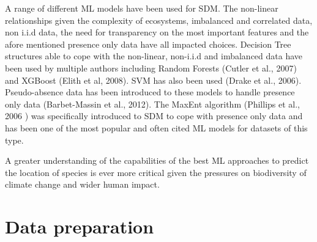 \documentclass{article}
\begin{document}
A range of different ML models have been used for SDM.  The non-linear relationships given the complexity of ecosystems,  imbalanced and correlated data, non i.i.d data, the need for transparency on the most important features and the afore mentioned presence only data have all impacted choices.   Decision Tree structures able to cope with the non-linear, non-i.i.d and imbalanced data have been used by multiple authors including Random Forests\cite{rf} (Cutler et al., 2007) and XGBoost\cite{xgboost} (Elith et al, 2008).  SVM has also been used \cite{svm}(Drake et al., 2006).   Pseudo-absence data has been introduced to these models to handle presence only data \cite{presence_only}(Barbet-Massin et al., 2012). The MaxEnt algorithm \cite{MaxEnt} (Phillips et al., 2006 ) was specifically introduced to SDM to cope with presence only data and has been one of the most popular and often cited ML models for datasets of this type.  

A greater understanding of the capabilities of the best ML approaches to predict the location of species is ever more critical given the pressures on biodiversity of climate change and wider human impact.

\section{Data preparation}
\end{document}
